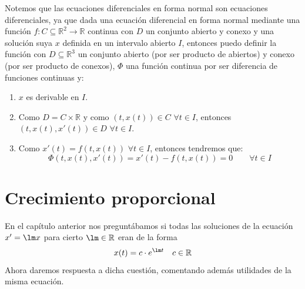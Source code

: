 \begin{observacion}
    Notemos que las ecuaciones diferenciales en forma normal son ecuaciones diferenciales, ya que dada una ecuación diferencial en forma normal mediante una función $f:C\subseteq\mathbb{R}^2\rightarrow\mathbb{R}$ continua con $D$ un conjunto abierto y conexo y una solución suya $x$ definida en un intervalo abierto $I$, entonces puedo definir la función
    con $D\subseteq\mathbb{R}^3$ un conjunto abierto (por ser producto de abiertos) y conexo (por ser producto de conexos), $\Phi$ una función continua por ser diferencia de funciones continuas y:
    \begin{enumerate}[label=(\roman*)]
        \item $x$ es derivable en $I$.
        \item Como $D=C\times \mathbb{R}$ y como $(t,x(t))\in C$ $\forall t\in I$, entonces $(t,x(t),x'(t))\in D$ $\forall t\in I$.
        \item Como $x'(t) = f(t,x(t))$ $\forall t\in I$, entonces tendremos que:
            \begin{equation*}
                \Phi(t,x(t),x'(t)) = x'(t) - f(t,x(t)) = 0 \qquad \forall t\in I
            \end{equation*}
    \end{enumerate}
\end{observacion}

\section{Crecimiento proporcional}
En el capítulo anterior nos preguntábamos si todas las soluciones de la ecuación $x'=\lm x$ para cierto $\lm \in \mathbb{R}$ eran de la forma
\begin{equation*}
    x(t) = c \cdot e^{\lm t} \quad c\in \mathbb{R}
\end{equation*}
Ahora daremos respuesta a dicha cuestión, comentando además utilidades de la misma ecuación.

